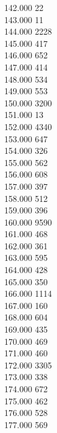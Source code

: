 { 142.000	22 \\
 143.000	11 \\
 144.000	2228 \\
 145.000	417 \\
 146.000	652 \\
 147.000	414 \\
 148.000	534 \\
 149.000	553 \\
 150.000	3200 \\
 151.000	13 \\
 152.000	4340 \\
 153.000	647 \\
 154.000	326 \\
 155.000	562 \\
 156.000	608 \\
 157.000	397 \\
 158.000	512 \\
 159.000	396 \\
 160.000	9590 \\
 161.000	468 \\
 162.000	361 \\
 163.000	595 \\
 164.000	428 \\
 165.000	350 \\
 166.000	1114 \\
 167.000	160 \\
 168.000	604 \\
 169.000	435 \\
 170.000	469 \\
 171.000	460 \\
 172.000	3305 \\
 173.000	338 \\
 174.000	672 \\
 175.000	462 \\
 176.000	528 \\
 177.000	569 \\
}

